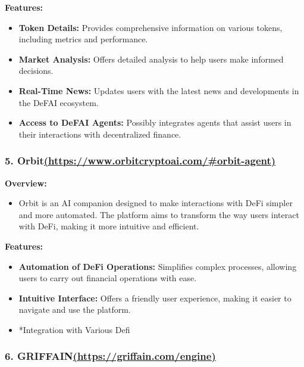 \documentclass[
]{article}
\providecommand{\tightlist}{%
  \setlength{\itemsep}{0pt}\setlength{\parskip}{0pt}}
\begin{document}
\textbf{Features:}

\begin{itemize}
\tightlist
\item
  \textbf{Token Details:} Provides comprehensive information on various
  tokens, including metrics and performance.
\item
  \textbf{Market Analysis:} Offers detailed analysis to help users make
  informed decisions.
\item
  \textbf{Real-Time News:} Updates users with the latest news and
  developments in the DeFAI ecosystem.
\item
  \textbf{Access to DeFAI Agents:} Possibly integrates agents that
  assist users in their interactions with decentralized finance.
\end{itemize}

\hypertarget{orbithttpswww.orbitcryptoai.comorbit-agent}{%
\subsubsection{\texorpdfstring{5.
Orbit\href{https://www.orbitcryptoai.com/\#orbit-agent}{(https://www.orbitcryptoai.com/\#orbit-agent)}}{5. Orbit(https://www.orbitcryptoai.com/\#orbit-agent)}}\label{orbithttpswww.orbitcryptoai.comorbit-agent}}

\textbf{Overview:}

\begin{itemize}
\tightlist
\item
  Orbit is an AI companion designed to make interactions with DeFi
  simpler and more automated. The platform aims to transform the way
  users interact with DeFi, making it more intuitive and efficient.
\end{itemize}

\textbf{Features:}

\begin{itemize}
\tightlist
\item
  \textbf{Automation of DeFi Operations:} Simplifies complex processes,
  allowing users to carry out financial operations with ease.
\item
  \textbf{Intuitive Interface:} Offers a friendly user experience,
  making it easier to navigate and use the platform.
\item
  *Integration with Various Defi
\end{itemize}

\hypertarget{griffainhttpsgriffain.comengine}{%
\subsubsection{\texorpdfstring{6.
GRIFFAIN\href{https://griffain.com/engine}{(https://griffain.com/engine)}}{6. GRIFFAIN(https://griffain.com/engine)}}\label{griffainhttpsgriffain.comengine}}
\end{document}
